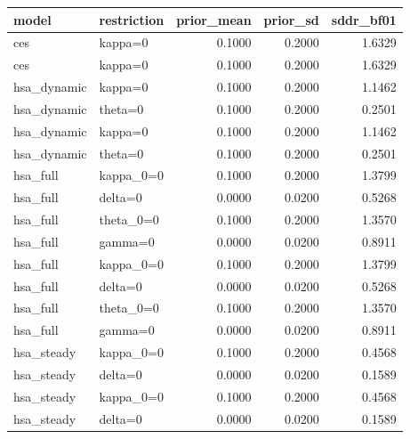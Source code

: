\begin{tabular}{llrrr}
\toprule
model & restriction & prior\_mean & prior\_sd & sddr\_bf01 \\
\midrule
ces & kappa=0 & 0.1000 & 0.2000 & 1.6329 \\
ces & kappa=0 & 0.1000 & 0.2000 & 1.6329 \\
hsa\_dynamic & kappa=0 & 0.1000 & 0.2000 & 1.1462 \\
hsa\_dynamic & theta=0 & 0.1000 & 0.2000 & 0.2501 \\
hsa\_dynamic & kappa=0 & 0.1000 & 0.2000 & 1.1462 \\
hsa\_dynamic & theta=0 & 0.1000 & 0.2000 & 0.2501 \\
hsa\_full & kappa\_0=0 & 0.1000 & 0.2000 & 1.3799 \\
hsa\_full & delta=0 & 0.0000 & 0.0200 & 0.5268 \\
hsa\_full & theta\_0=0 & 0.1000 & 0.2000 & 1.3570 \\
hsa\_full & gamma=0 & 0.0000 & 0.0200 & 0.8911 \\
hsa\_full & kappa\_0=0 & 0.1000 & 0.2000 & 1.3799 \\
hsa\_full & delta=0 & 0.0000 & 0.0200 & 0.5268 \\
hsa\_full & theta\_0=0 & 0.1000 & 0.2000 & 1.3570 \\
hsa\_full & gamma=0 & 0.0000 & 0.0200 & 0.8911 \\
hsa\_steady & kappa\_0=0 & 0.1000 & 0.2000 & 0.4568 \\
hsa\_steady & delta=0 & 0.0000 & 0.0200 & 0.1589 \\
hsa\_steady & kappa\_0=0 & 0.1000 & 0.2000 & 0.4568 \\
hsa\_steady & delta=0 & 0.0000 & 0.0200 & 0.1589 \\
\bottomrule
\end{tabular}
